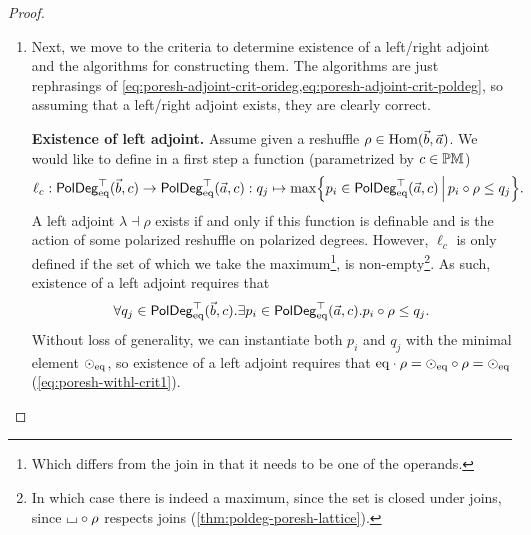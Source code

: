 \documentclass[a4paper]{memoir}
\begin{document}
\begin{proof}
\begin{enumerate}
		Conversely, assume that $\lambda \dashv \rho$. Then we have
		\begin{align*}
			P_i \leq Q_j \oriof \lambda &\quad\Rightarrow\quad P_i \oriof \rho \leq (Q_j \oriof \lambda) \oriof \rho = Q_j \oriof (\lambda \circ \rho) \leq Q_j, \\
			P_i \oriof \rho \leq Q_j &\quad\Rightarrow\quad P_i \leq P_i \oriof (\rho \circ \lambda) = (P_i \oriof \rho) \oriof \lambda \leq Q_j \oriof \lambda,
		\end{align*}
		so all adjoint pairs satisfy \cref{eq:poresh-adjoint-crit-orideg} and, equivalently, \cref{eq:poresh-adjoint-crit-poldeg}.
		
		\item Next, we move to the criteria to determine existence of a left/right adjoint and the algorithms for constructing them.
		The algorithms are just rephrasings of \cref{eq:poresh-adjoint-crit-orideg,eq:poresh-adjoint-crit-poldeg}, so assuming that a left/right adjoint exists, they are clearly correct.
		
		\textbf{Existence of left adjoint.} Assume given a reshuffle $\rho \in {\mathrm{Hom}}(\vec b, \vec a)$.
		We would like to define in a first step a function (parametrized by $c \in {\mathbb{PM}}$)
		\[
			\ell_c : \mathsf{PolDeg}_{\mathrm{eq}}^\top(\vec b, c) \to \mathsf{PolDeg}_{\mathrm{eq}}^\top(\vec a, c) : q_j \mapsto \max \mathopen{}\left\{ p_i \in \mathsf{PolDeg}_{\mathrm{eq}}^\top(\vec a, c) \,\middle|\, p_i \circ \rho \leq q_j \right\}\mathclose{}.
		\]
		A left adjoint $\lambda \dashv \rho$ exists if and only if this function is definable and is the action of some polarized reshuffle on polarized degrees.
		However, $\ell_c$ is only defined if the set of which we take the maximum\footnote{Which differs from the join in that it needs to be one of the operands.}, is non-empty\footnote{In which case there is indeed a maximum, since the set is closed under joins, since ${\llcorner\hspace{-.4ex}\lrcorner} \circ \rho$ respects joins (\cref{thm:poldeg-poresh-lattice}).}.
		As such, existence of a left adjoint requires that
		\[
			\forall q_j \in \mathsf{PolDeg}_{\mathrm{eq}}^\top(\vec b, c). \exists p_i \in \mathsf{PolDeg}_{\mathrm{eq}}^\top(\vec a, c).p_i \circ \rho \leq q_j.
		\]
		Without loss of generality, we can instantiate both $p_i$ and $q_j$ with the minimal element ${\odot}_{\mathrm{eq}}$, so existence of a left adjoint requires that ${\mathrm{eq}} \cdot \rho = {\odot}_{\mathrm{eq}} \circ \rho = {\odot}_{\mathrm{eq}}$ (\cref{eq:poresh-withl-crit1}).
		

\end{enumerate}
\end{proof}
\end{document}
